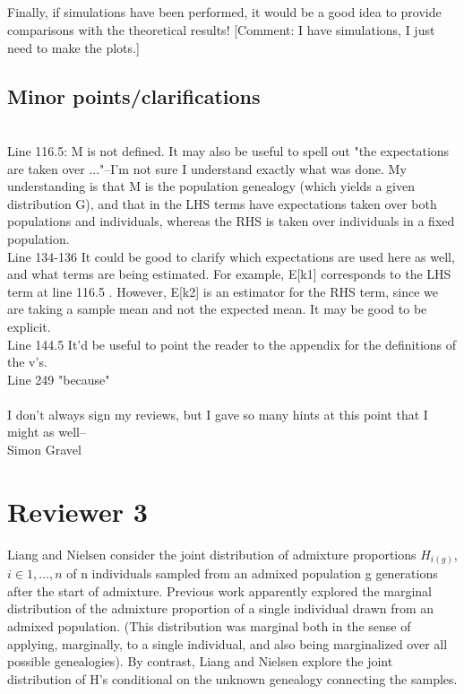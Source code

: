 \documentclass[11pt]{amsart}
\begin{document}
\subsection{}
Finally, if simulations have been performed, it would be a good idea to provide comparisons with the
theoretical results!
[Comment: I have simulations, I just need to make the plots.]


\subsection*{Minor points/clarifications}\ \\
Line 116.5: M is not defined. It may also be useful to spell out "the expectations are taken over ..."--I'm not
sure I understand exactly what was done. My understanding is that M is the population genealogy (which
yields a given distribution G), and that in the LHS terms have expectations taken over both populations and
individuals, whereas the RHS is taken over individuals in a fixed population.\\
Line 134-136
It could be good to clarify which expectations are used here as well, and what terms are being estimated.
For example, E[k1] corresponds to the LHS term at line 116.5 . However, E[k2] is an estimator for the RHS
term, since we are taking a sample mean and not the expected mean. It may be good to be explicit.\\
Line 144.5
It'd be useful to point the reader to the appendix for the definitions of the v's.\\
Line 249 "because"\\
\\
I don't always sign my reviews, but I gave so many hints at this point that I might as well--\\
Simon Gravel

\section{Reviewer 3}
Liang and Nielsen consider the joint distribution of admixture proportions $H_{i(g)}$, $i\in 1,\ldots, n$ of
n individuals sampled from an admixed population g generations after the start of admixture. Previous
work apparently explored the marginal distribution of the admixture proportion of a single individual
drawn from an admixed population. (This distribution was marginal both in the sense of applying,
marginally, to a single individual, and also being marginalized over all possible genealogies). By contrast,
Liang and Nielsen explore the joint distribution of H's conditional on the unknown genealogy connecting
the samples.
\end{document}
